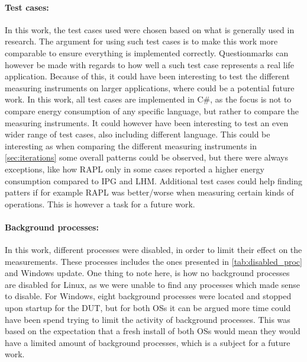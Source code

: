 \paragraph*{Test cases:} In this work, the test cases used were chosen based on what is generally used in research\cite*[]{Koedijk2022diff, greenland2016statistical}. The argument for using such test cases is to make this work more comparable to ensure everything is implemented correctly. Questionmarks can however be made with regards to how well a such test case represents a real life application. Because of this, it could have been interesting to test the different measuring instruments on larger applications, where could be a potential future work. In this work, all test cases are implemented in C\#, as the focus is not to compare energy consumption of any specific language, but rather to compare the measuring instruments. It could however have been interesting to test an even wider range of test cases, also including different language. This could be interesting as when comparing the different measuring instruments in \cref*{sec:iterations} some overall patterns could be observed, but there were always exceptions, like how RAPL only in some cases reported a higher energy consumption compared to IPG and LHM. Additional test cases could help finding patters if for example RAPL was better/worse when measuring certain kinds of operations. This is however a task for a future work.  

\paragraph*{Background processes:} In this work, different processes were disabled, in order to limit their effect on the measurements. These processes includes the ones presented in \cref*{tab:disabled_proc} and Windows update. One thing to note here, is how no background processes are disabled for Linux, as we were unable to find any processes which made sense to disable. For Windows, eight background processes were located and stopped upon startup for the DUT, but for both OSs it can be argued more time could have been spend trying to limit the activity of background processes. This was based on the expectation that a fresh install of both OSs would mean they would have a limited amount of background processes, which is a subject for a future work. 

